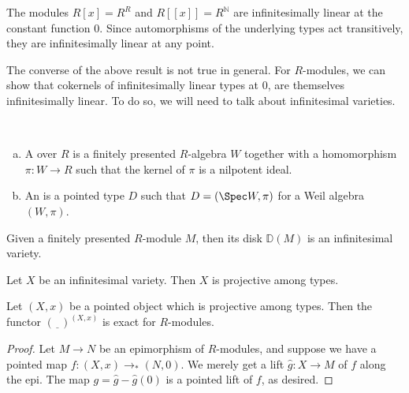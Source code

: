 \begin{example}
  The modules $R[x] = R^R$ and $R[[x]] = R^\mathbb{N}$ are infinitesimally linear at the constant function $0$. Since automorphisms of the underlying types act transitively, they are infinitesimally linear at any point.
\end{example}

The converse of the above result is not true in general.
For $R$-modules, we can show that cokernels of infinitesimally linear types at $0$, are themselves infinitesimally linear.
To do so, we will need to talk about infinitesimal varieties.

\begin{definition}
  \phantom{M} \\
  \begin{enumerate}[(a)]
  \item A  over $R$ is a finitely presented $R$-algebra $W$ together with a homomorphism $\pi : W \to R$ such that the kernel of $\pi$ is a nilpotent ideal.
  \item An  is a pointed type $D$ such that $D = (\Spec W, \pi)$ for a Weil algebra $(W, \pi)$.
  \end{enumerate}
\end{definition}

Given a finitely presented $R$-module $M$, then its disk $\mathbb{D}(M)$ is an infinitesimal variety.

\begin{lemma}\label{infinitesimal-projective}
  Let $X$ be an infinitesimal variety.
  Then $X$ is projective among types.
\end{lemma}

\begin{proposition}\label{projective-exact}
  Let $(X,x)$ be a pointed object which is projective among types.
  Then the functor $(\underline{\phantom{Y}})^{(X,x)}$ is exact for $R$-modules.
\end{proposition}

\begin{proof}
  Let $M \rightarrow N$ be an epimorphism of $R$-modules, and suppose we have a pointed map $f : (X,x) \rightarrow_\ast (N,0)$.
  We merely get a lift $\hat{g} : X \rightarrow M$ of $f$ along the epi.
  The map $g = \hat{g} - \hat{g}(0)$ is a pointed lift of $f$, as desired.
\end{proof}

